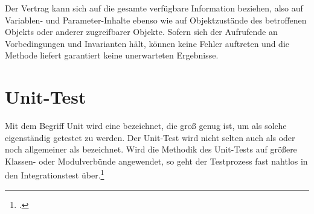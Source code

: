 \documentclass{bschlangaul-theorie}
\begin{document}
Der Vertrag kann sich auf die gesamte verfügbare Information beziehen,
also auf Variablen- und Parameter-Inhalte ebenso wie auf Objektzustände
des betroffenen Objekts oder anderer zugreifbarer Objekte. Sofern sich
der Aufrufende an Vorbedingungen und Invarianten hält, können keine
Fehler auftreten und die Methode liefert garantiert keine unerwarteten
Ergebnisse.

\section{Unit-Test}

Mit dem Begriff Unit wird eine 
bezeichnet, die groß genug ist, um als solche eigenständig getestet zu
werden. Der Unit-Test wird nicht selten auch als  oder
noch allgemeiner als  bezeichnet. Wird die
Methodik des Unit-Tests auf größere Klassen- oder Modulverbünde
angewendet, so geht der Testprozess fast nahtlos in den Integrationstest
über.\footcite[Seite 159 Kapitel 4.2.1.1 Unit Tests]{hoffmann:software}

\literatur
\end{document}
